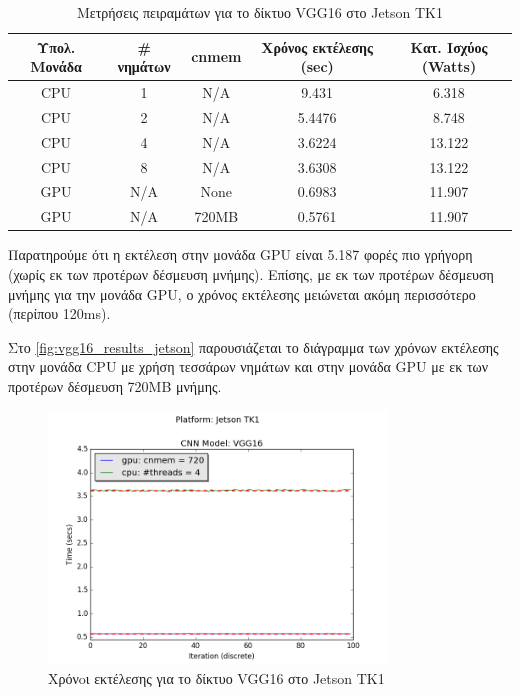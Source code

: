 \begin{table}[H]
  \begin{center}
    \caption{Μετρήσεις πειραμάτων για το δίκτυο VGG16 στο Jetson TK1}
    \label{tab:vgg16_jetson}
    \small
    \begin{tabular}[center]{ | c | c | c | c | c | }
      \hline
      \rowcolor{Gray}
      Υπολ. Μονάδα & \# νημάτων & cnmem & Χρόνος εκτέλεσης (sec) & Κατ. Ισχύος (Watts) \\
      \hline
      CPU & 1 & N/A & 9.431 & 6.318 \\
      CPU & 2 & N/A & 5.4476 &  8.748\\
      CPU & 4 & N/A & 3.6224 & 13.122\\
      CPU & 8 & N/A & 3.6308 & 13.122\\
      GPU & N/A & None & 0.6983 & 11.907\\
      GPU & N/A & 720MB & 0.5761 & 11.907\\
      \hline
    \end{tabular}
  \end{center}
\end{table}

Παρατηρούμε ότι η εκτέλεση στην μονάδα GPU είναι 5.187 φορές πιο
γρήγορη (χωρίς εκ των προτέρων δέσμευση μνήμης).
Επίσης, με εκ των προτέρων δέσμευση μνήμης για την μονάδα GPU, ο χρόνος εκτέλεσης μειώνεται ακόμη
περισσότερο (περίπου 120ms).

Στο \autoref{fig:vgg16_results_jetson} παρουσιάζεται το διάγραμμα
των χρόνων εκτέλεσης στην μονάδα CPU με χρήση τεσσάρων νημάτων και στην μονάδα
GPU με εκ των προτέρων δέσμευση 720MB μνήμης.

\begin{figure}[!ht]
  \centering
  \includegraphics[width=0.8\textwidth]{./images/chapter6/benchmark_vgg16_jetson.png}
  \caption[Χρόνoι εκτέλεσης για το δίκτυο VGG16 στο Jetson TK1]{Χρόνoι εκτέλεσης για το δίκτυο VGG16 στο Jetson TK1}
  \label{fig:vgg16_results_jetson}
\end{figure}


